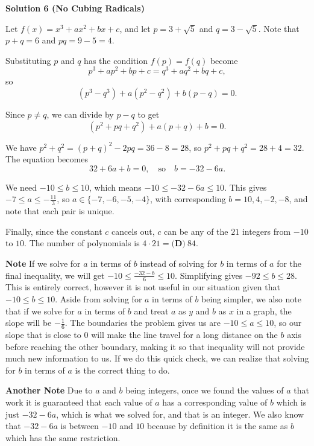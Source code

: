 \begin{enumerate}
 



\textbf{Solution 6 (No Cubing Radicals)}

Let $f(x) = x^3 + ax^2 + bx + c$, and let $p = 3 + \sqrt{5}$ and $q = 3 - \sqrt{5}$. Note that $p + q = 6$ and $pq = 9 - 5 = 4$.

 Substituting $p$ and $q$ has the condition $f(p) = f(q)$ become
 \[p^3 + ap^2 + bp + c = q^3 + aq^2 + bq + c,\]so
 \[(p^3 - q^3) + a(p^2 - q^2) + b(p - q) = 0.\]

 Since $p \neq q$, we can divide by $p - q$ to get
 \[(p^2 + pq + q^2) + a(p + q) + b = 0.\]

 We have $p^2 + q^2 = (p + q)^2 - 2pq = 36 - 8 = 28$, so $p^2 + pq + q^2 = 28 + 4 = 32$. The equation becomes
 \[32 + 6a + b = 0, \quad\text{so}\quad b = -32 - 6a.\]

 We need $-10 \le b \le 10$, which means $-10 \le -32 - 6a \le 10$. This gives $-7 \le a \le -\frac{11}{3}$, so $a \in \{-7, -6, -5, -4\}$, with corresponding $b = 10, 4, -2, -8$, and note that each pair is unique.

 Finally, since the constant $c$ cancels out, $c$ can be any of the $21$ integers from $-10$ to $10$. The number of polynomials is $4 \cdot 21 = \boxed{\textbf{(D)}~84}$.

 


 \textbf{Note} If we solve for $a$ in terms of $b$ instead of solving for $b$ in terms of $a$ for the final inequality, we will get $-10 \le \frac{-32 - b}{6} \le 10$. Simplifying gives $-92 \le b \le 28$. This is entirely correct, however it is not useful in our situation given that $-10 \le b \le 10$. Aside from solving for $a$ in terms of $b$ being simpler, we also note that if we solve for $a$ in terms of $b$ and treat $a$ as $y$ and $b$ as $x$ in a graph, the slope will be $-\frac{1}{6}$. The boundaries the problem gives us are $-10 \le a \le 10$, so our slope that is close to $0$ will make the line travel for a long distance on the $b$ axis before reaching the other boundary, making it so that inequality will not provide much new information to us. If we do this quick check, we can realize that solving for $b$ in terms of $a$ is the correct thing to do.

 \textbf{Another Note} Due to $a$ and $b$ being integers, once we found the values of $a$ that work it is guaranteed that each value of $a$ has a corresponding value of $b$ which is just $-32-6a$, which is what we solved for, and that is an integer. We also know that $-32-6a$ is between $-10$ and $10$ because by definition it is the same as $b$ which has the same restriction.


\end{enumerate}
